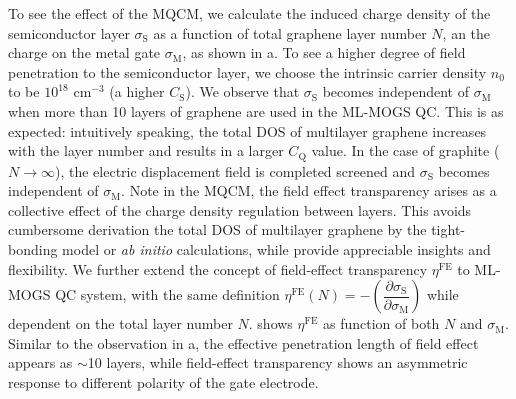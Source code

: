 To see the effect of the MQCM, we calculate the induced charge density
of the semiconductor layer $\sigma_{\mathrm{S}}$ as a function of
total graphene layer number $N$, an the charge on the metal gate
$\sigma_{\mathrm{M}}$, as shown in a.
%
To see a higher degree of field penetration to the semiconductor
layer, we choose the intrinsic carrier density $n_{0}$ to be $10^{18}$
cm$^{-3}$ (\ie a higher $C_{\mathrm{S}}$).
%
We observe that $\sigma_{\mathrm{S}}$ becomes independent of
$\sigma_{\mathrm{M}}$ when more than 10 layers of graphene are used in
the ML-MOGS QC.
%
This is as expected: intuitively speaking, the total DOS of multilayer
graphene increases with the layer number and results in a larger
$C_{\mathrm{Q}}$ value.
%
In the case of graphite ($N \to \infty$), the electric displacement
field is completed screened and $\sigma_{\mathrm{S}}$ becomes independent
of $\sigma_{\mathrm{M}}$.
%
Note in the MQCM, the field effect transparency arises as a collective
effect of the charge density regulation between layers. This avoids
cumbersome derivation the total DOS of multilayer graphene by the
tight-bonding model \cite{Nilsson_2008_bitri_gr_electron} or
\textit{ab initio} calculations, while provide appreciable insights
and flexibility.
%
We further extend the concept of field-effect transparency
$\eta^{\mathrm{FE}}$ to ML-MOGS QC system, with the same definition
$\eta^{\mathrm{FE}}(N) = -\left(\dfrac{\partial
    \sigma_{\mathrm{S}}}{\partial \sigma_{\mathrm{M}}}\right)$ while
dependent on the total layer number $N$.
%
 shows $\eta^{\mathrm{FE}}$ as function of both $N$ and $\sigma_{\mathrm{M}}$.
%
Similar to the observation in a, the effective
penetration length of field effect appears as $\sim{}$10 layers, while
field-effect transparency shows an asymmetric response to different
polarity of the gate electrode.
%


